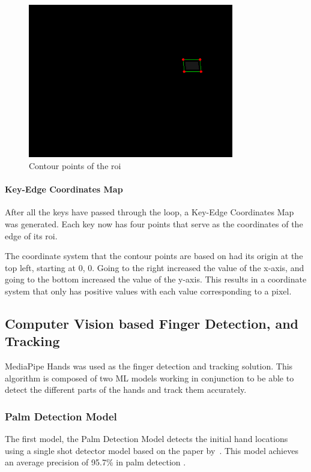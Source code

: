 \documentclass{report}
\begin{document}
\begin{figure}[H]
	\centering
	\includegraphics[width=0.8\textwidth]{scaled-contour.png}
	\caption{Contour points of the \ac{roi}}
	\label{fig:metho-algo-scale-roi}
	\centering
\end{figure}

\paragraph{Key-Edge Coordinates Map}
After all the keys have passed through the loop, a Key-Edge Coordinates Map was
generated. Each key now has four points that serve as the coordinates of the
edge of its \ac{roi}.

The coordinate system that the contour points are based on had its origin at the
top left, starting at 0, 0. Going to the right increased the value of the
x-axis, and going to the bottom increased the value of the y-axis. This results
in a coordinate system that only has positive values with each value
corresponding to a pixel.


\subsection{Computer Vision based Finger Detection, and Tracking}
\label{section:metho-algo-finger}
MediaPipe Hands was used as the finger detection and tracking solution. This
algorithm is composed of two ML models working in conjunction to be able to
detect the different parts of the hands and track them accurately.

\subsubsection{Palm Detection Model}
The first model, the Palm Detection Model detects the initial hand locations
using a single shot detector model based on the paper by~\cite{ssd}. This model
achieves an average precision of 95.7\% in palm detection
\parencite{mediapipe-hands}.
\end{document}
